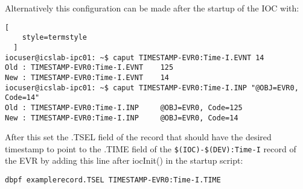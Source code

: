 \documentclass[11pt
  , a4paper
  , article
  , oneside
  , showtrims
]{memoir}
\begin{document}
Alternatively this configuration can be made after the startup of the IOC with:
\begin{lstlisting}[
    style=termstyle
  ]
iocuser@icslab-ipc01: ~$ caput TIMESTAMP-EVR0:Time-I.EVNT 14
Old : TIMESTAMP-EVR0:Time-I.EVNT    125
New : TIMESTAMP-EVR0:Time-I.EVNT    14
iocuser@icslab-ipc01: ~$ caput TIMESTAMP-EVR0:Time-I.INP "@OBJ=EVR0, Code=14"
Old : TIMESTAMP-EVR0:Time-I.INP     @OBJ=EVR0, Code=125
New : TIMESTAMP-EVR0:Time-I.INP     @OBJ=EVR0, Code=14
\end{lstlisting}

After this set the .TSEL field of the record that should have the desired timestamp to point to the .TIME field of the \texttt{\$(IOC)-\$(DEV):Time-I} record of the EVR by adding this line after iocInit() in the startup script:
\begin{lstlisting}[style=termstyle]
dbpf examplerecord.TSEL TIMESTAMP-EVR0:Time-I.TIME
\end{lstlisting}



\clearpage

\backmatter
%
%
\end{document}
